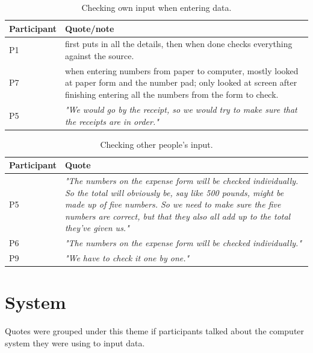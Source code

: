 \begin{table}[htp]
\centering
    \begin{tabular}{ | l | p{10cm} |}
    \hline
     \textbf{Participant} & \textbf{Quote/note} \\ \hline
    P1 &  first puts in all the details, then when done checks everything against the source. \\ \hline
    P7 & when entering numbers from paper to computer, mostly looked at paper form and the number pad; only looked at screen after finishing entering all the numbers from the form to check. \\ \hline
    P5 & \textit{"We would go by the receipt, so we would try to make sure that the receipts are in order."} \\ \hline

    \hline
    \end{tabular}
    \caption[Study 1 checking own input]{Checking own input when entering data.}
    \label{table:ch3_owninputquotes}
\end{table}%

\begin{table}[htp]
\centering
    \begin{tabular}{ | l | p{10cm} |}
    \hline
     \textbf{Participant} & \textbf{Quote} \\ \hline
    P5 &  \textit{"The numbers on the expense form will be checked individually. So the total will obviously be, say like 500 pounds, might be made up of five numbers. So we need to make sure the five numbers are correct, but that they also all add up to the total they've given us."} \\ \hline
    P6 & \textit{"The numbers on the expense form will be checked individually."}\\ \hline
    P9 & \textit{"We have to check it one by one."} \\ \hline

    \hline
    \end{tabular}
    \caption[Study 1 checking other people's input]{Checking other people's input.}
    \label{table:ch3_otherinputquotes}
\end{table}%

\newpage

\section{System}
Quotes were grouped under this theme if participants talked about the computer system they were using to input data. 

